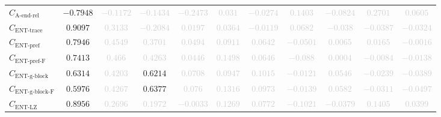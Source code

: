 \documentclass{standalone}
\newcommand{\lastactivitiesrelname}{\text{A-end-rel}}
\newcommand{\lastactivitiesrel}{C_{\lastactivitiesrelname}}
\newcommand{\enttracename}{\text{ENT-trace}}
\newcommand{\enttrace}{C_{\enttracename}}
\newcommand{\entprefixname}{\text{ENT-pref}}
\newcommand{\entprefix}{C_{\entprefixname}}
\newcommand{\entprefixflatname}{\text{ENT-pref-F}}
\newcommand{\entprefixflat}{C_{\entprefixflatname}}
\newcommand{\entgblockname}{\text{ENT-g-block}}
\newcommand{\entgblock}{C_{\entgblockname}}
\newcommand{\entgblockflatname}{\text{ENT-g-block-F}}
\newcommand{\entgblockflat}{C_{\entgblockflatname}}
\newcommand{\entlempelzivname}{\text{ENT-LZ}}
\newcommand{\entlempelziv}{C_{\entlempelzivname}}
\begin{document}
\begin{tabular}{lcccccccccc}
$\lastactivitiesrel$ & $-0.7948$ & \textcolor{lightgray}{$-0.1172$} & \textcolor{lightgray}{$-0.1434$} & \textcolor{lightgray}{$-0.2473$} & \textcolor{lightgray}{$0.031$} & \textcolor{lightgray}{$-0.0274$} & \textcolor{lightgray}{$0.1403$} & \textcolor{lightgray}{$-0.0824$} & \textcolor{lightgray}{$0.2701$} & \textcolor{lightgray}{$0.0605$} \\ 
$\enttrace$ & $0.9097$ & \textcolor{lightgray}{$0.3133$} & \textcolor{lightgray}{$-0.2084$} & \textcolor{lightgray}{$0.0197$} & \textcolor{lightgray}{$0.0364$} & \textcolor{lightgray}{$-0.0119$} & \textcolor{lightgray}{$0.0682$} & \textcolor{lightgray}{$-0.038$} & \textcolor{lightgray}{$-0.0387$} & \textcolor{lightgray}{$-0.0324$} \\ 
$\entprefix$ & $0.7946$ & \textcolor{lightgray}{$0.4549$} & \textcolor{lightgray}{$0.3701$} & \textcolor{lightgray}{$0.0494$} & \textcolor{lightgray}{$0.0911$} & \textcolor{lightgray}{$0.0642$} & \textcolor{lightgray}{$-0.0501$} & \textcolor{lightgray}{$0.0065$} & \textcolor{lightgray}{$0.0165$} & \textcolor{lightgray}{$-0.0016$} \\ 
$\entprefixflat$ & $0.7413$ & \textcolor{lightgray}{$0.466$} & \textcolor{lightgray}{$0.4263$} & \textcolor{lightgray}{$0.0446$} & \textcolor{lightgray}{$0.1498$} & \textcolor{lightgray}{$0.0646$} & \textcolor{lightgray}{$-0.088$} & \textcolor{lightgray}{$0.0004$} & \textcolor{lightgray}{$-0.0084$} & \textcolor{lightgray}{$-0.0138$} \\ 
$\entgblock$ & $0.6314$ & \textcolor{lightgray}{$0.4203$} & $0.6214$ & \textcolor{lightgray}{$0.0708$} & \textcolor{lightgray}{$0.0947$} & \textcolor{lightgray}{$0.1015$} & \textcolor{lightgray}{$-0.0121$} & \textcolor{lightgray}{$0.0546$} & \textcolor{lightgray}{$-0.0239$} & \textcolor{lightgray}{$-0.0389$} \\ 
$\entgblockflat$ & $0.5976$ & \textcolor{lightgray}{$0.4267$} & $0.6377$ & \textcolor{lightgray}{$0.076$} & \textcolor{lightgray}{$0.1316$} & \textcolor{lightgray}{$0.0973$} & \textcolor{lightgray}{$-0.0139$} & \textcolor{lightgray}{$0.0582$} & \textcolor{lightgray}{$-0.0311$} & \textcolor{lightgray}{$-0.0497$} \\ 
$\entlempelziv$ & $0.8956$ & \textcolor{lightgray}{$0.2696$} & \textcolor{lightgray}{$0.1972$} & \textcolor{lightgray}{$-0.0033$} & \textcolor{lightgray}{$0.1269$} & \textcolor{lightgray}{$0.0772$} & \textcolor{lightgray}{$-0.1021$} & \textcolor{lightgray}{$-0.0379$} & \textcolor{lightgray}{$0.1405$} & \textcolor{lightgray}{$0.0399$} \\ 

\end{tabular}
\end{document}

